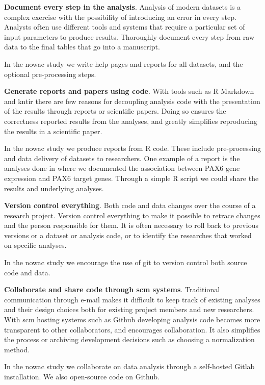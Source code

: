 \textbf{Document every step in the analysis}. Analysis of modern datasets is a
complex exercise with the possibility of introducing an error in every step.
Analysts often use different tools and systems that require a particular set of
input parameters to produce results. Thoroughly document every step from raw
data to the final tables that go into a manuscript.

In the \gls{nowac} study we write help pages and reports for all datasets, and
the optional pre-processing steps. 

\textbf{Generate reports and papers using code}. With tools such as R
Markdown\cite{rmarkdown} and kntir there are few reasons for decoupling analysis
code with the presentation of the results through reports or scientific papers.
Doing so ensures the correctness reported results from the analyses, and greatly
simplifies reproducing the results in a scientific paper. 

In the \gls{nowac} study we produce reports from R code. These include
pre-processing and data delivery of datasets to researchers. One example of a
report is the analyses done in \cite{kiselev2018transcription} where we
documented the association between PAX6 gene expression and PAX6 target genes.
Through a simple R script we could share the results and underlying analyses.

\textbf{Version control everything}. Both code and data changes over the course
of a research project. Version control everything to make it possible to retrace
changes and the person responsible for them. It is often necessary to roll back
to previous versions or a dataset or analysis code, or to identify the
researches that worked on specific analyses. 

In the \gls{nowac} study we encourage the use of git to version control both
source code and data. 

\textbf{Collaborate and share code through \gls{scm} systems}. Traditional
communication through e-mail makes it difficult to keep track of existing
analyses and their design choices both for existing project members and new
researchers. With \gls{scm} hosting systems such as Github developing
analysis code becomes more transparent to other collaborators, and encourages
collaboration. It also simplifies the process or archiving development decisions
such as choosing a normalization method.

In the \gls{nowac} study we collaborate on data analysis through a self-hosted
Gitlab\cite{gitlab} installation. We also open-source code on Github. 

